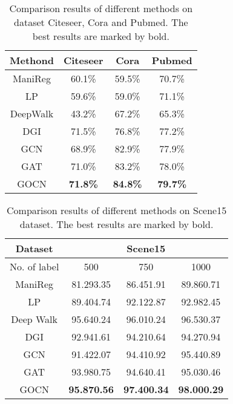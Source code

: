 \documentclass{article}
\begin{document}
\begin{table}[!htp]
\centering
\caption{Comparison results of different methods on  dataset Citeseer, Cora and Pubmed. The best results are marked by bold.}
\centering
\begin{tabular}{c|c|c|c}
  \hline
  \hline
Methond & Citeseer & Cora & Pubmed\\
  \hline
  ManiReg & 60.1\% & 59.5\% & 70.7\%\\
  LP & 59.6\% & 59.0\% & 71.1\%\\
  DeepWalk & 43.2\% &67.2\% & 65.3\%\\
  DGI &71.5\% & 76.8\% & 77.2\%\\
  GCN & 68.9\% & 82.9\% & 77.9\%\\
  GAT & 71.0\% & 83.2\% & 78.0\%\\
  \hline
  GOCN & \textbf{71.8\%} & \textbf{84.8\%} & \textbf{79.7\%}\\
  \hline
  \hline
\end{tabular}
\end{table}
\begin{table}
\centering
\caption{\upshape Comparison results of different methods on Scene15 dataset. The best results are marked by bold.}
\begin{tabular}{c||c|c|c}
  \hline
  \hline
   Dataset& \multicolumn{ 3}{c}{Scene15}\\
  \hline
  No. of label & 500 & 750 & 1000 \\
  \hline
   ManiReg  & 81.293.35 & 86.451.91 & 89.860.71\\
   LP        & 89.404.74 & 92.122.87 & 92.982.45\\
   Deep Walk & 95.640.24 & 96.010.24 & 96.530.37\\
   DGI      & 92.941.61 & 94.210.64 & 94.270.94\\
   GCN      & 91.422.07 & 94.410.92 & 95.440.89\\
   GAT      &  93.980.75 & 94.640.41 & 95.030.46\\
   \hline
   GOCN     & \textbf{95.870.56} & \textbf{97.400.34} & \textbf{98.000.29}\\
  \hline
  \hline
\end{tabular}
\end{table}
\end{document}
